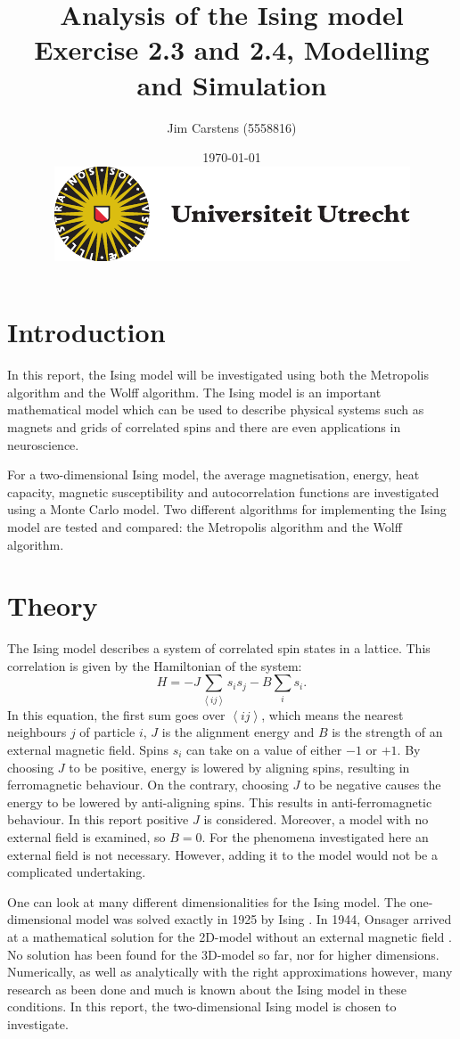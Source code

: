 \documentclass[a4paper]{article}
\title{\textbf{Analysis of the Ising model} \\\large{Exercise 2.3 and 2.4, Modelling and Simulation}}
\author{Jim Carstens (5558816)}
\date{\today \\ \includegraphics[scale=0.4]{uulogo.pdf}}
\begin{document}
\maketitle
\hrulefill
\tableofcontents
\hrulefill
\section*{Introduction}
In this report, the Ising model will be investigated using both the Metropolis algorithm and the Wolff algorithm. The Ising model is an important mathematical model which can be used to describe physical systems such as magnets and grids of correlated spins and there are even applications in neuroscience. 

For a two-dimensional Ising model, the average magnetisation, energy, heat capacity, magnetic susceptibility and autocorrelation functions are investigated using a Monte Carlo model. Two different algorithms for implementing the Ising model are tested and compared: the Metropolis algorithm and the Wolff algorithm.

\section{Theory}  \label{sec:c}
The Ising model describes a system of correlated spin states in a lattice. This correlation is given by the Hamiltonian of the system:
\begin{equation} \label{eq:ham}
	H=-J\sum_{\left<ij\right>}s_i s_j -B\sum_{i}s_i.
\end{equation}
In this equation, the first sum goes over $\left<ij\right>$, which means the nearest neighbours $j$ of particle $i$, $J$ is the alignment energy and $B$ is the strength of an external magnetic field. Spins $s_i$ can take on a value of either $-1$ or $+1$. By choosing $J$ to be positive, energy is lowered by aligning spins, resulting in ferromagnetic behaviour. On the contrary, choosing $J$ to be negative causes the energy to be lowered by anti-aligning spins. This results in anti-ferromagnetic behaviour. In this report positive $J$ is considered. Moreover, a model with no external field is examined, so $B = 0$. For the phenomena investigated here an external field is not necessary. However, adding it to the model would not be a complicated undertaking.

One can look at many different dimensionalities for the Ising model. The one-dimensional model was solved exactly in 1925 by Ising \cite{Ising:1925em}. In 1944, Onsager arrived at a mathematical solution for the 2D-model without an external magnetic field \cite{1944PhRv...65..117O}. No solution has been found for the 3D-model so far, nor for higher dimensions. Numerically, as well as analytically with the right approximations however, many research as been done and much is known about the Ising model in these conditions. In this report, the two-dimensional Ising model is chosen to investigate.
\end{document}
